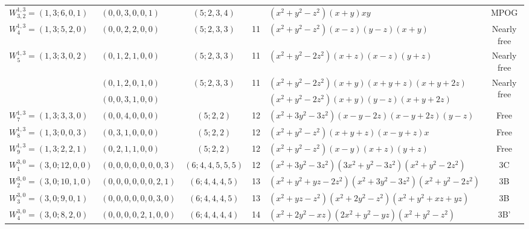 \documentclass[11pt]{article}
\theoremstyle{plain}
\theoremstyle{definition}
\begin{document}
\begin{landscape}
\begin{table}[h]
\begin{tabular}{@{}llcclc@{}}
    $W_{3,2}^{1,3}=(1,3;6,0,1)$ & $(0,0,3,0,0,1)$ & $(5;2,3,4)$ & & $(x^2+y^2-z^2)(x+y)xy$ & MPOG \\
\hdashline
 
   $W_4^{1,3}=(1,3;5,2,0)$ & $(0,0,2,2,0,0)$ & $(5;2,3,3)$ & 11 & $(x^2+y^2-z^2)(x-z)(y-z)(x+y)$ & Nearly free \\
  

    $W_5^{1,3}=(1,3;3,0,2)$ & $(0,1,2,1,0,0)$ & $(5;2,3,3)$ & 11 & $(x^2+y^2-2z^2)(x+z)(x-z)(y+z)$ & Nearly free \\


\hdashline
    \multirow{2}{*}{$W_6^{1,3}=(1,3;4,1,1)$} & $(0,1,2,0,1,0)$ & \multirow{2}{*}{$(5;2,3,3)$} & \multirow{2}{*}{11} & $(x^2+y^2- 2z^2)(x+y)(x+y+z)(x+y+2z)$ & \multirow{2}{*}{Nearly free} \\

     & $(0,0,3,1,0,0)$ & & & $(x^2+y^2-2z^2)(x+y)(y-z)(x+y+2z)$ & \\

    
\hdashline

  $W_7^{1,3}=(1,3;3,3,0)$ & $(0,0,4,0,0,0)$ & $(5;2,2)$ & 12 & $(x^2+3y^2-3z^2)(x-y-2z)(x-y+2z)(y-z)$ & Free \\

      $W_8^{1,3}=(1,3;0,0,3)$ & $(0,3,1,0,0,0)$ & $(5;2,2)$ & 12 & $(x^2+y^2-z^2)(x+y+z)(x-y+z)x$ & Free \\
    
    $W_9^{1,3}=(1,3;2,2,1)$ & $(0,2,1,1,0,0)$ & $(5;2,2)$ & 12 & $(x^2+y^2-z^2)(x-y)(x+z)(y+z)$ & Free \\

    

  \midrule
  
   $W_1^{3,0}=(3,0;12,0,0)$ & $(0,0,0,0,0,0,0,3)$ & $(6;4,4,5,5,5)$ & 12 & $ (x^2+3y^2-3z^2)(3x^2+y^2-3z^2)(x^2+y^2-2z^2)$ & 3C \\
  
  $W_2^{3,0}=(3,0;10,1,0)$ & $(0,0,0,0,0,0,2,1)$ & $(6;4,4,4,5)$ & 13 &
$(x^2 + y^2 + yz - 2z^2)(x^2 + 3y^2 - 3z^2)(x^2 + y^2 - 2z^2)$ & 3B \\

  $W_3^{3,0}=(3,0;9,0,1)$ & $(0,0,0,0,0,0,3,0)$ & $(6;4,4,4,5)$ & 13 & $(x^2+yz-z^2)(x^2+2y^2-z^2)(x^2+y^2+xz+yz)$ & 3B \\
  
  $W_4^{3,0}=(3,0;8,2,0)$ & $(0,0,0,0,2,1,0,0)$ & $(6;4,4,4,4)$ & 14 & $(x^2+2y^2-xz)(2x^2+y^2-yz)(x^2+y^2-z^2)$ & 3B' \\
 
  
  
 \bottomrule

 \end{tabular}

 \end{table}
 \end{landscape}
\end{document}

